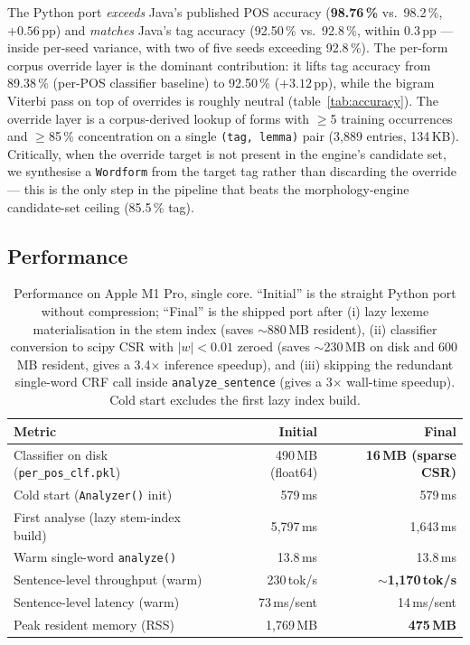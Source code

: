 \documentclass[11pt,a4paper]{article}
\begin{document}
The Python port \emph{exceeds} Java's published POS accuracy
(\textbf{98.76\,\%} vs.\ 98.2\,\%, $+0.56$\,pp) and \emph{matches} Java's
tag accuracy (92.50\,\% vs.\ 92.8\,\%, within 0.3\,pp --- inside per-seed
variance, with two of five seeds exceeding 92.8\,\%). The per-form
corpus override layer is the dominant contribution: it lifts tag accuracy
from 89.38\,\% (per-POS classifier baseline) to 92.50\,\% ($+3.12$\,pp),
while the bigram Viterbi pass on top of overrides is roughly neutral
(table~\ref{tab:accuracy}). The override layer is a corpus-derived lookup
of forms with $\geq$5 training occurrences and $\geq$85\,\% concentration
on a single \texttt{(tag, lemma)} pair (3{,}889 entries, 134\,KB).
Critically, when the override target is not present in the engine's
candidate set, we synthesise a \texttt{Wordform} from the target tag
rather than discarding the override --- this is the only step in the
pipeline that beats the morphology-engine candidate-set ceiling
(85.5\,\% tag).

\subsection{Performance}

\begin{table}[h]
\centering
\begin{tabular}{lrr}
\toprule
\textbf{Metric} & \textbf{Initial} & \textbf{Final} \\
\midrule
Classifier on disk (\texttt{per\_pos\_clf.pkl}) & 490\,MB (float64) & \textbf{16\,MB (sparse CSR)} \\
Cold start (\texttt{Analyzer()} init) & 579\,ms & 579\,ms \\
First analyse (lazy stem-index build) & 5{,}797\,ms & 1{,}643\,ms \\
Warm single-word \texttt{analyze()} & 13.8\,ms & 13.8\,ms \\
Sentence-level throughput (warm) & 230\,tok/s & \textbf{$\sim$1{,}170\,tok/s} \\
Sentence-level latency (warm) & 73\,ms/sent & 14\,ms/sent \\
Peak resident memory (RSS) & 1{,}769\,MB & \textbf{475\,MB} \\
\bottomrule
\end{tabular}
\caption{Performance on Apple M1 Pro, single core. ``Initial'' is the
straight Python port without compression; ``Final'' is the shipped port
after (i) lazy lexeme materialisation in the stem index (saves $\sim$880\,MB
resident), (ii) classifier conversion to scipy CSR with $|w|<0.01$
zeroed (saves $\sim$230\,MB on disk and 600\,MB resident, gives a 3.4$\times$
inference speedup), and (iii) skipping the redundant single-word CRF call
inside \texttt{analyze\_sentence} (gives a 3$\times$ wall-time speedup).
Cold start excludes the first lazy index build.}
\label{tab:perf}
\end{table}
\end{document}
